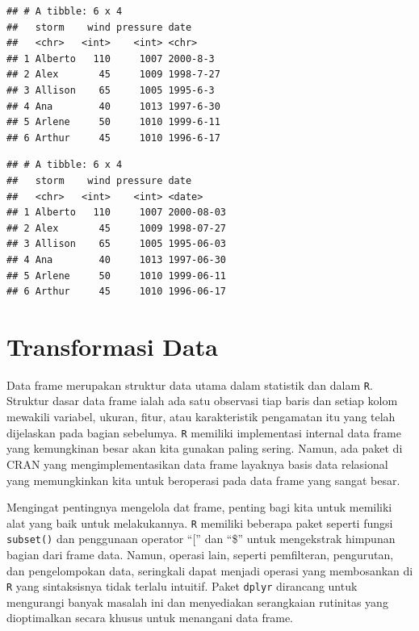 \documentclass[]{book}
\newenvironment{Shaded}{\begin{snugshade}}{\end{snugshade}}
\newcommand{\KeywordTok}[1]{\textcolor[rgb]{0.13,0.29,0.53}{\textbf{#1}}}
\newcommand{\StringTok}[1]{\textcolor[rgb]{0.31,0.60,0.02}{#1}}
\newcommand{\CommentTok}[1]{\textcolor[rgb]{0.56,0.35,0.01}{\textit{#1}}}
\newcommand{\OperatorTok}[1]{\textcolor[rgb]{0.81,0.36,0.00}{\textbf{#1}}}
\newcommand{\NormalTok}[1]{#1}
\begin{document}
\begin{verbatim}
## # A tibble: 6 x 4
##   storm    wind pressure date     
##   <chr>   <int>    <int> <chr>    
## 1 Alberto   110     1007 2000-8-3 
## 2 Alex       45     1009 1998-7-27
## 3 Allison    65     1005 1995-6-3 
## 4 Ana        40     1013 1997-6-30
## 5 Arlene     50     1010 1999-6-11
## 6 Arthur     45     1010 1996-6-17
\end{verbatim}

\begin{Shaded}
\end{Shaded}

\begin{verbatim}
## # A tibble: 6 x 4
##   storm    wind pressure date      
##   <chr>   <int>    <int> <date>    
## 1 Alberto   110     1007 2000-08-03
## 2 Alex       45     1009 1998-07-27
## 3 Allison    65     1005 1995-06-03
## 4 Ana        40     1013 1997-06-30
## 5 Arlene     50     1010 1999-06-11
## 6 Arthur     45     1010 1996-06-17
\end{verbatim}

\section{Transformasi Data}\label{transformasi-data}

Data frame merupakan struktur data utama dalam statistik dan dalam
\texttt{R}. Struktur dasar data frame ialah ada satu observasi tiap
baris dan setiap kolom mewakili variabel, ukuran, fitur, atau
karakteristik pengamatan itu yang telah dijelaskan pada bagian
sebelumya. \texttt{R} memiliki implementasi internal data frame yang
kemungkinan besar akan kita gunakan paling sering. Namun, ada paket di
CRAN yang mengimplementasikan data frame layaknya basis data relasional
yang memungkinkan kita untuk beroperasi pada data frame yang sangat
besar.

Mengingat pentingnya mengelola dat frame, penting bagi kita untuk
memiliki alat yang baik untuk melakukannya. \texttt{R} memiliki beberapa
paket seperti fungsi \texttt{subset()} dan penggunaan operator ``{[}''
dan ``\$'' untuk mengekstrak himpunan bagian dari frame data. Namun,
operasi lain, seperti pemfilteran, pengurutan, dan pengelompokan data,
seringkali dapat menjadi operasi yang membosankan di \texttt{R} yang
sintaksisnya tidak terlalu intuitif. Paket \texttt{dplyr} dirancang
untuk mengurangi banyak masalah ini dan menyediakan serangkaian
rutinitas yang dioptimalkan secara khusus untuk menangani data frame.
\end{document}
